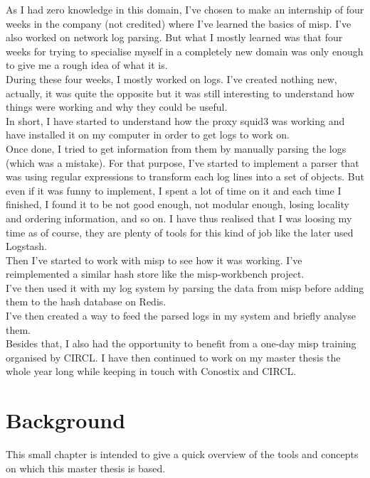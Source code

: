 \documentclass{eplmastersthesis}
\begin{document}
As I had zero knowledge in this domain, I've chosen to make an internship of four weeks in the company (not credited) where I've learned the basics of \gls{misp}. I've also worked on network log parsing. But what I mostly learned was that four weeks for trying to specialise myself in a completely new domain was only enough to give me a rough idea of what it is.\\
During these four weeks, I mostly worked on logs. I've created nothing new, actually, it was quite the opposite but it was still interesting to understand how things were working and why they could be useful. \\
In short, I have started to understand how the proxy squid3 was working and have installed it on my computer in order to get logs to work on.\\
Once done, I tried to get information from them by manually parsing the logs (which was a mistake). For that purpose, I've started to implement a parser that was using regular expressions to transform each log lines into a set of objects. But even if it was funny to implement, I spent a lot of time on it and each time I finished, I found it to be not good enough, not modular enough, losing locality and ordering information, and so on. I have thus realised that I was loosing my time as of course, they are plenty of tools for this kind of job like the later used Logstash.\\
Then I've started to work with \gls{misp} to see how it was working. I've reimplemented a similar hash store like the misp-workbench project.\\
I've then used it with my log system by parsing the data from \gls{misp} before adding them to the hash database on Redis.\\
I've then created a way to feed the parsed logs in my system and briefly analyse them.\\
Besides that, I also had the opportunity to benefit from a one-day \gls{misp} training organised by CIRCL.
I have then continued to work on my master thesis the whole year long while keeping in touch with Conostix and CIRCL.

\chapter{Background}
This small chapter is intended to give a quick overview of the tools and concepts on which this master thesis is based.
\end{document}
